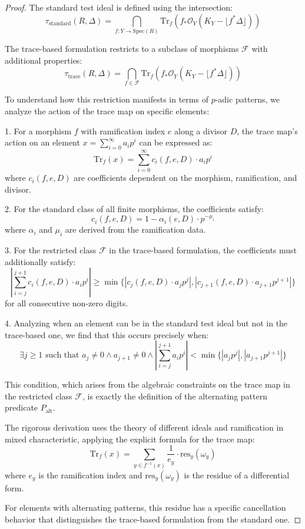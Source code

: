 \begin{proof}
The standard test ideal is defined using the intersection:
$$\tau_{\text{standard}}(R,\Delta) = \bigcap_{f: Y \to \text{Spec}(R)} \text{Tr}_f(f_*\mathcal{O}_Y(K_Y - \lfloor f^*\Delta\rfloor))$$

The trace-based formulation restricts to a subclass of morphisms $\mathcal{F}$ with additional properties:
$$\tau_{\text{trace}}(R,\Delta) = \bigcap_{f \in \mathcal{F}} \text{Tr}_f(f_*\mathcal{O}_Y(K_Y - \lfloor f^*\Delta\rfloor))$$

To understand how this restriction manifests in terms of $p$-adic patterns, we analyze the action of the trace map on specific elements:

1. For a morphism $f$ with ramification index $e$ along a divisor $D$, the trace map's action on an element $x = \sum_{i=0}^{\infty} a_i p^i$ can be expressed as:
   $$\text{Tr}_f(x) = \sum_{i=0}^{\infty} c_i(f,e,D) \cdot a_i p^i$$
   where $c_i(f,e,D)$ are coefficients dependent on the morphism, ramification, and divisor.

2. For the standard class of all finite morphisms, the coefficients satisfy:
   $$c_i(f,e,D) = 1 - \alpha_i(e,D) \cdot p^{-\mu_i}$$
   where $\alpha_i$ and $\mu_i$ are derived from the ramification data.

3. For the restricted class $\mathcal{F}$ in the trace-based formulation, the coefficients must additionally satisfy:
   $$\left|\sum_{i=j}^{j+1} c_i(f,e,D) \cdot a_i p^i\right| \geq \min\{|c_j(f,e,D) \cdot a_j p^j|, |c_{j+1}(f,e,D) \cdot a_{j+1} p^{j+1}|\}$$
   for all consecutive non-zero digits.

4. Analyzing when an element can be in the standard test ideal but not in the trace-based one, we find that this occurs precisely when:
   $$\exists j \geq 1 \text{ such that } a_j \neq 0 \wedge a_{j+1} \neq 0 \wedge \left|\sum_{i=j}^{j+1} a_i p^i\right| < \min\{|a_j p^j|, |a_{j+1} p^{j+1}|\}$$

This condition, which arises from the algebraic constraints on the trace map in the restricted class $\mathcal{F}$, is exactly the definition of the alternating pattern predicate $P_{\text{alt}}$.

The rigorous derivation uses the theory of different ideals and ramification in mixed characteristic, applying the explicit formula for the trace map:
$$\text{Tr}_f(x) = \sum_{y \in f^{-1}(x)} \frac{1}{e_y} \cdot \text{res}_y(\omega_y)$$
where $e_y$ is the ramification index and $\text{res}_y(\omega_y)$ is the residue of a differential form.

For elements with alternating patterns, this residue has a specific cancellation behavior that distinguishes the trace-based formulation from the standard one.
\end{proof}

